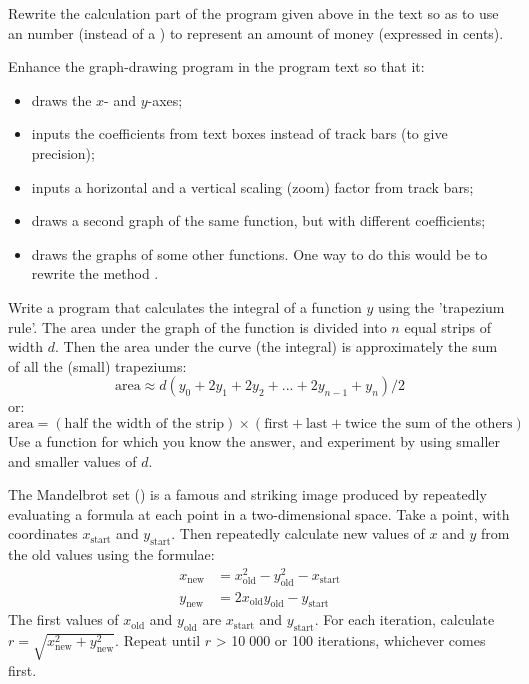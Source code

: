 \begin{EXE}
			\item {} Rewrite the calculation part of the program given above in the text so as to use an  number (instead of a ) to represent an amount of money (expressed in cents).
			\item	{} Enhance the graph-drawing program in the program text so that it:
				\begin{itemize}
	      	\item draws the $x$- and $y$-axes;
  	  	  \item inputs the coefficients from text boxes instead of track bars (to give precision);
    		  \item inputs a horizontal and a vertical scaling (zoom) factor from track bars;
  	    	\item draws a second graph of the same function, but with different coefficients;
					\item draws the graphs of some other functions. One way to do this would be to rewrite the method .
				\end{itemize}
			\item	{} Write a program that calculates the integral of a function $y$ using the 'trapezium rule'. The area under the graph of the function is divided into $n$ equal strips of width $d$. Then the area under the curve (the integral) is approximately the sum of all the (small) trapeziums:
				\begin{equation*}
					\text{area} \approx d(y_0 + 2y_1 + 2y_2 + . . . + 2y_{n-1} + y_n)/2
				\end{equation*}
				or:
				\begin{equation*}
					\text{area} = (\text{half the width of the strip}) × (\text{first} + \text{last} + \text{twice the sum of the others})
				\end{equation*}
				Use a function for which you know the answer, and experiment by using smaller and smaller values of $d$.
			\item	{} The Mandelbrot set () is a famous and striking image produced by repeatedly evaluating a formula at each point in a two-dimensional space. Take a point, with coordinates $x_\text{start}$ and $y_\text{start}$. Then repeatedly calculate new values of $x$ and $y$ from the old values using the formulae:
				\begin{align*}
					x_\text{new} &= x_\text{old}^2 - y_\text{old}^2 - x_\text{start}\\
					y_\text{new} &= 2 x_\text{old} y_\text{old} - y_\text{start}
				\end{align*}
				The first values of $x_\text{old}$ and $y_\text{old}$ are $x_\text{start}$ and $y_\text{start}$. For each iteration, calculate $r = \sqrt{x_\text{new}^2 + y_\text{new}^2}$. Repeat until $r$ > 10 000 or 100 iterations, whichever comes first. 


\end{EXE}
